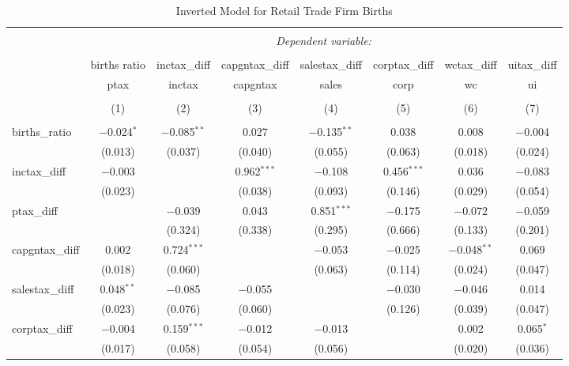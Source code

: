 
\begin{table}[!htbp] \centering 
  \caption{Inverted Model for  Retail Trade Firm Births} 
  \label{44-45rd} 
\footnotesize 
\begin{tabular}{@{\extracolsep{5pt}}lccccccc} 
\\[-1.8ex]\hline 
\hline \\[-1.8ex] 
 & \multicolumn{7}{c}{\textit{Dependent variable:}} \\ 
\cline{2-8} 
\\[-1.8ex] & births ratio & inctax\_diff & capgntax\_diff & salestax\_diff & corptax\_diff & wctax\_diff & uitax\_diff \\ 
 & ptax & inctax & capgntax & sales & corp & wc & ui \\ 
\\[-1.8ex] & (1) & (2) & (3) & (4) & (5) & (6) & (7)\\ 
\hline \\[-1.8ex] 
 births\_ratio & $-$0.024$^{*}$ & $-$0.085$^{**}$ & 0.027 & $-$0.135$^{**}$ & 0.038 & 0.008 & $-$0.004 \\ 
  & (0.013) & (0.037) & (0.040) & (0.055) & (0.063) & (0.018) & (0.024) \\ 
  inctax\_diff & $-$0.003 &  & 0.962$^{***}$ & $-$0.108 & 0.456$^{***}$ & 0.036 & $-$0.083 \\ 
  & (0.023) &  & (0.038) & (0.093) & (0.146) & (0.029) & (0.054) \\ 
  ptax\_diff &  & $-$0.039 & 0.043 & 0.851$^{***}$ & $-$0.175 & $-$0.072 & $-$0.059 \\ 
  &  & (0.324) & (0.338) & (0.295) & (0.666) & (0.133) & (0.201) \\ 
  capgntax\_diff & 0.002 & 0.724$^{***}$ &  & $-$0.053 & $-$0.025 & $-$0.048$^{**}$ & 0.069 \\ 
  & (0.018) & (0.060) &  & (0.063) & (0.114) & (0.024) & (0.047) \\ 
  salestax\_diff & 0.048$^{**}$ & $-$0.085 & $-$0.055 &  & $-$0.030 & $-$0.046 & 0.014 \\ 
  & (0.023) & (0.076) & (0.060) &  & (0.126) & (0.039) & (0.047) \\ 
  corptax\_diff & $-$0.004 & 0.159$^{***}$ & $-$0.012 & $-$0.013 &  & 0.002 & 0.065$^{*}$ \\ 
  & (0.017) & (0.058) & (0.054) & (0.056) &  & (0.020) & (0.036) \\ 

\end{tabular}
\end{table}
